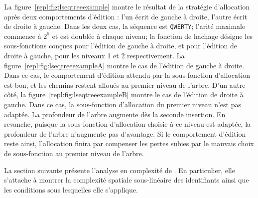 La figure~\ref{repl:fig:lseqtreeexample} montre le résultat de la stratégie
d'allocation \LSEQ après deux comportements d'édition : l'un écrit de gauche à
droite, l'autre écrit de droite à gauche. Dans les deux cas, la séquence est
\texttt{QWERTY}; l'arité maximale commence à $2^5$ et est doublée à chaque
niveau; la fonction de hachage désigne les sous-fonctions conçues pour l'édition
de gauche à droite, et pour l'édition de droite à gauche, pour les niveaux 1 et
2 respectivement. La figure~\ref{repl:fig:lseqtreeexampleA} montre le cas de
l'édition de gauche à droite. Dans ce cas, le comportement d'édition attendu par
la sous-fonction d'allocation est bon, et les chemins restent alloués au premier
niveau de l'arbre. D'un autre côté, la figure~\ref{repl:fig:lseqtreeexampleB}
montre le cas de l'édition de droite à gauche. Dans ce cas, la sous-fonction
d'allocation du premier niveau n'est pas adaptée. La profondeur de l'arbre
augmente dès la seconde insertion. En revanche, puisque la sous-fonction
d'allocation choisie à ce niveau est adaptée, la profondeur de l'arbre
n'augmente pas d'avantage. Si le comportement d'édition reste ainsi,
l'allocation finira par compenser les pertes subies par le mauvais choix de
sous-fonction au premier niveau de l'arbre.

La section suivante présente l'analyse en complexité de \LSEQ. En particulier,
elle s'attache à montrer la complexité spatiale sous-linéaire des identifiants
ainsi que les conditions sous lesquelles elle s'applique.

